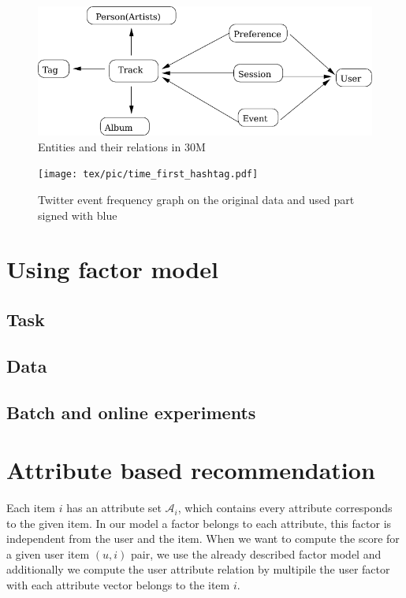 \begin{figure} \label{fig:30m-data}
\centering 
\includegraphics[scale=1]{tex/pic/30m_data_structure.pdf}
\caption{Entities and their relations in 30M}
\end{figure}


\begin{figure}[''placement specifier''] \label{fig:online}
\centering 
\texttt{[image: tex/pic/time\_first\_hashtag.pdf]}
\caption{Twitter event frequency graph on the original data and used part signed with blue}
\end{figure}
\cite{dobos2013multi}


\section{Using factor model}
\subsection{Task}
\subsection{Data}
\subsection{Batch and online experiments}

\section{Attribute based recommendation}
Each item $i$ has an attribute set $\mathcal{A}_{i}$, which contains every attribute corresponds 
to the given item. In our model a factor belongs to each attribute, this factor is independent 
from the user and the item. When we want to compute the score for a given user item $(u,i)$ pair, 
we use the already described factor model and additionally we compute the user attribute relation by 
multipile the user factor with each attribute vector belongs to the item $i$.

